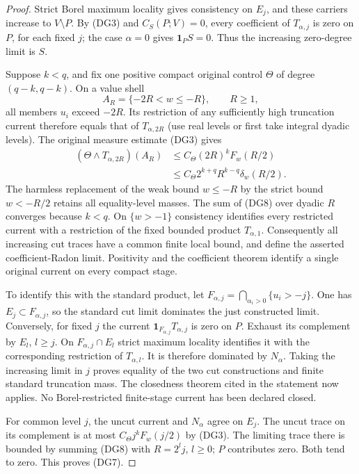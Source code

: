 \documentclass[11pt,a4paper]{article}
\numberwithin{equation}{section}
\theoremstyle{definition}
\theoremstyle{remark}
\begin{document}
\begin{proof}
Strict Borel maximum locality gives consistency on $E_j$,
and these carriers increase to $V\setminus P$. By (DG3) and
$C_S(P;V)=0$, every coefficient of $T_{\alpha,j}$ is zero on
$P$, for each fixed $j$; the case $\alpha=0$ gives
$\mathbf1_P S=0$. Thus the increasing zero-degree limit is $S$.

Suppose $k<q$, and fix one positive compact original control
$\Theta$ of degree $(q-k,q-k)$. On a value shell
\[
                  A_R=\{-2R<w\leq-R\},\qquad R\geq1,
\]
all members $u_i$ exceed $-2R$. Its restriction of any sufficiently
high truncation current therefore equals that of $T_{\alpha,2R}$
(use real levels or first take integral dyadic levels).
The original measure estimate (DG3) gives
\[
 \begin{split}
 (\Theta\wedge T_{\alpha,2R})(A_R)
 &\leq C_\Theta(2R)^k F_w(R/2)\\
 &\leq C_\Theta 2^{k+q}R^{k-q}\delta_w(R/2).
 \end{split}
 \tag{DG8}
\]
The harmless replacement of the weak bound $w\leq-R$ by the
strict bound $w<-R/2$ retains all equality-level masses.
The sum of (DG8) over dyadic $R$ converges because $k<q$.
On $\{w>-1\}$ consistency identifies every restricted current
with a restriction of the fixed bounded product $T_{\alpha,1}$.
Consequently all increasing cut traces have a common finite
local bound, and define the asserted coefficient-Radon limit.
Positivity and the coefficient theorem identify a single original
current on every compact stage.

To identify this with the standard product, let
$F_{\alpha,j}=\bigcap_{\alpha_i>0}\{u_i>-j\}$.
One has $E_j\subset F_{\alpha,j}$, so the standard cut limit
dominates the just constructed limit. Conversely, for fixed $j$
the current $\mathbf1_{F_{\alpha,j}}T_{\alpha,j}$ is zero on
$P$. Exhaust its complement by $E_l$, $l\geq j$.
On $F_{\alpha,j}\cap E_l$ strict maximum locality identifies it
with the corresponding restriction of $T_{\alpha,l}$.
It is therefore dominated by $N_\alpha$. Taking the increasing
limit in $j$ proves equality of the two cut constructions and
finite standard truncation mass. The closedness theorem cited
in the statement now applies. No Borel-restricted finite-stage
current has been declared closed.

For common level $j$, the uncut current and $N_\alpha$ agree
on $E_j$. The uncut trace on its complement is at most
$C_\Theta j^kF_w(j/2)$ by (DG3). The limiting trace there is
bounded by summing (DG8) with $R=2^lj$, $l\geq0$; $P$
contributes zero. Both tend to zero. This proves (DG7).


\end{proof}
\end{document}
